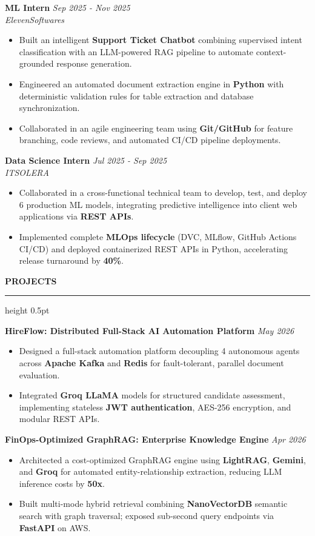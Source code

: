 \documentclass[10pt,letterpaper]{article}
\newcommand{\resumesection}[1]{%
  \vspace{3.5pt}%
  {\fontsize{10.5pt}{12pt}\selectfont\textbf{\MakeUppercase{#1}}}%
  \vspace{1.5pt}%
  \hrule height 0.5pt%
  \vspace{2.5pt}%
}
\begin{document}
\vspace{2pt}
\noindent\textbf{ML Intern} \hfill \textit{Sep 2025 - Nov 2025} \\
\textit{ElevenSoftwares}
\begin{itemize}
  \item Built an intelligent \textbf{Support Ticket Chatbot} combining supervised intent classification with an LLM-powered RAG pipeline to automate context-grounded response generation.
  \item Engineered an automated document extraction engine in \textbf{Python} with deterministic validation rules for table extraction and database synchronization.
  \item Collaborated in an agile engineering team using \textbf{Git/GitHub} for feature branching, code reviews, and automated CI/CD pipeline deployments.
\end{itemize}

\vspace{2pt}
\noindent\textbf{Data Science Intern} \hfill \textit{Jul 2025 - Sep 2025} \\
\textit{ITSOLERA}
\begin{itemize}
  \item Collaborated in a cross-functional technical team to develop, test, and deploy 6 production ML models, integrating predictive intelligence into client web applications via \textbf{REST APIs}.
  \item Implemented complete \textbf{MLOps lifecycle} (DVC, MLflow, GitHub Actions CI/CD) and deployed containerized REST APIs in Python, accelerating release turnaround by \textbf{40\%}.
\end{itemize}

\resumesection{Projects}
\noindent\textbf{HireFlow: Distributed Full-Stack AI Automation Platform} \hfill \textit{May 2026}
\begin{itemize}
  \item Designed a full-stack automation platform decoupling 4 autonomous agents across \textbf{Apache Kafka} and \textbf{Redis} for fault-tolerant, parallel document evaluation.
  \item Integrated \textbf{Groq LLaMA} models for structured candidate assessment, implementing stateless \textbf{JWT authentication}, AES-256 encryption, and modular REST APIs.
\end{itemize}

\vspace{2pt}
\noindent\textbf{FinOps-Optimized GraphRAG: Enterprise Knowledge Engine} \hfill \textit{Apr 2026}
\begin{itemize}
  \item Architected a cost-optimized GraphRAG engine using \textbf{LightRAG}, \textbf{Gemini}, and \textbf{Groq} for automated entity-relationship extraction, reducing LLM inference costs by \textbf{50x}.
  \item Built multi-mode hybrid retrieval combining \textbf{NanoVectorDB} semantic search with graph traversal; exposed sub-second query endpoints via \textbf{FastAPI} on AWS.
\end{itemize}
\end{document}

